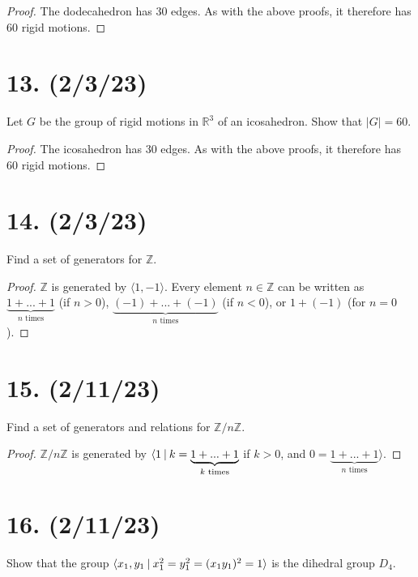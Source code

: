 \documentclass{article}
\begin{document}
\begin{proof}
    The dodecahedron has 30 edges. As with the above proofs, it therefore has 60 rigid motions.
\end{proof}

\section*{13. (2/3/23)}

Let $G$ be the group of rigid motions in $\mathbb{R}^3$ of an icosahedron. Show that $|G| = 60$.

\begin{proof}
    The icosahedron has 30 edges. As with the above proofs, it therefore has 60 rigid motions.
\end{proof}

\section*{14. (2/3/23)}

Find a set of generators for $\mathbb{Z}$.

\begin{proof}
    $\mathbb{Z}$ is generated by $\langle 1, -1 \rangle$. Every element $n \in \mathbb{Z}$ can be written as $\underbrace{1 + ... + 1}_{\text{$n$ times}}$ (if $n > 0$), $\underbrace{(-1) + ... + (-1)}_{\text{$n$ times}}$ (if $n < 0$), or $1 + (-1)$ (for $n = 0$).
\end{proof}

\section*{15. (2/11/23)}

Find a set of generators and relations for $\mathbb{Z}/n\mathbb{Z}$.

\begin{proof}
    $\mathbb{Z}/n\mathbb{Z}$ is generated by $\langle 1\hspace{0.5ex}|\hspace{0.5ex} k = \underbrace{1 + ... + 1}_{\text{$k$ times}}$ if $k > 0$, and $0 = \underbrace{1 + ... + 1}_{\text{$n$ times}} \rangle$.
\end{proof}

\section*{16. (2/11/23)}

Show that the group $\langle x_1, y_1 \hspace{0.5ex}|\hspace{0.5ex} x_1^2 = y_1^2 = (x_1 y_1)^2 = 1 \rangle$ is the dihedral group $D_4$.
\end{document}
